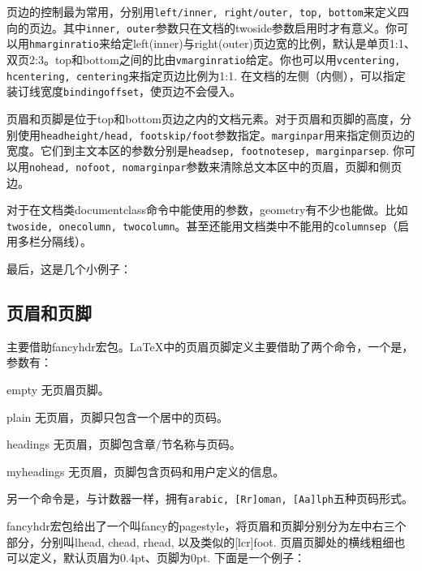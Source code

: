 {页边的控制最为常用，分别用\texttt{left/inner, right/outer, top, bottom}来定义四向的页边。其中\texttt{inner, outer}参数只在文档的twoside参数启用时才有意义。你可以用\texttt{hmarginratio}来给定left(inner)与right(outer)页边宽的比例，默认是单页1:1、双页2:3。top和bottom之间的比由\texttt{vmarginratio}给定。你也可以用\texttt{vcentering, hcentering, centering}来指定页边比例为1:1. 在文档的左侧（内侧），可以指定装订线宽度\texttt{bindingoffset}，使页边不会侵入。

页眉和页脚是位于top和bottom页边之内的文档元素。对于页眉和页脚的高度，分别使用\texttt{headheight/head, footskip/foot}参数指定。\texttt{marginpar}用来指定侧页边的宽度。它们到主文本区的参数分别是\texttt{headsep, footnotesep, marginparsep}. 你可以用\texttt{nohead, nofoot, nomarginpar}参数来清除总文本区中的页眉，页脚和侧页边。

对于在文档类documentclass命令中能使用的参数，geometry有不少也能做。比如\texttt{twoside, onecolumn, twocolumn}。甚至还能用文档类中不能用的\texttt{columnsep}（启用多栏分隔线）。

最后，这是几个小例子：
\begin{latex}{}
\usepackage[hmargin=1.25in,vmargin=1in]{geometry}
\usepackage[inner=1in,outer=1.25in]{geometry}
\end{latex}

\subsection{页眉和页脚}
主要借助fancyhdr宏包。\LaTeX 中的页眉页脚定义主要借助了两个命令，一个是\latexline{\\pagestyle}，参数有：
\begin{para}
\item[empty] 无页眉页脚。
\item[plain] 无页眉，页脚只包含一个居中的页码。
\item[headings] 无页眉，页脚包含章/节名称与页码。
\item[myheadings] 无页眉，页脚包含页码和用户定义的信息。
\end{para}

另一个命令是\latexline{\\pagenumbering}，与计数器一样，拥有\texttt{arabic, [Rr]oman, [Aa]lph}五种页码形式。

fancyhdr宏包给出了一个叫fancy的pagestyle，将页眉和页脚分别分为左中右三个部分，分别叫lhead, chead, rhead, 以及类似的[lcr]foot. 页眉页脚处的横线粗细也可以定义，默认页眉为0.4pt、页脚为0pt. 下面是一个例子：
\begin{latex}{}
\usepackage{fancyhdr}
\pagestyle{fancy}
  \lhead{}
  \chead{}
  \cfoot{\thepage}
\renewcommand{\headrulewidth}{0.4pt}
\renewcommand{\footrulewidth}{0.4pt}
\end{latex}

}
